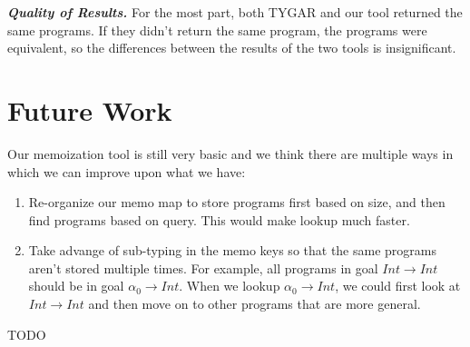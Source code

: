 \documentclass[acmsmall,nonacm]{acmart}
\begin{document}
\vspace{2mm}
\noindent \textbf{\textit{Quality of Results.}} For the most part, both TYGAR 
and our tool returned the same programs. If they didn't return the same program,
the programs were equivalent, so the differences between the results of the two
tools is insignificant. 

\section{Future Work}
\label{future}

Our memoization tool is still very basic and we think there are multiple ways in
which we can improve upon what we have:

\begin{enumerate}
  \item Re-organize our memo map to store programs first based on size, and then 
        find programs based on query. This would make lookup much faster.
  \item Take advange of sub-typing in the memo keys so that the same programs
        aren't stored multiple times. For example, all programs in goal 
        $Int \to Int$ should be in goal $\alpha_0 \to Int$. When
        we lookup $\alpha_0 \to Int$, we could first look at $Int \to Int$
        and then move on to other programs that are more general.
\end{enumerate}



TODO
\end{document}
